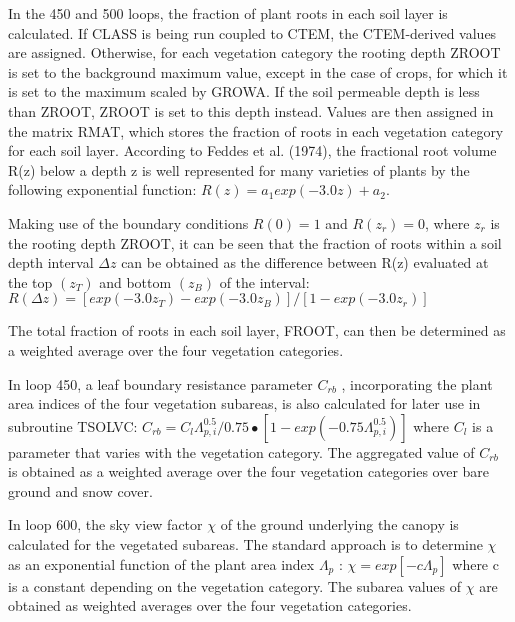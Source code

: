 In the 450 and 500 loops, the fraction of plant roots in each soil layer is calculated. If C\+L\+A\+S\+S is being run coupled to C\+T\+E\+M, the C\+T\+E\+M-\/derived values are assigned. Otherwise, for each vegetation category the rooting depth Z\+R\+O\+O\+T is set to the background maximum value, except in the case of crops, for which it is set to the maximum scaled by G\+R\+O\+W\+A. If the soil permeable depth is less than Z\+R\+O\+O\+T, Z\+R\+O\+O\+T is set to this depth instead. Values are then assigned in the matrix R\+M\+A\+T, which stores the fraction of roots in each vegetation category for each soil layer. According to Feddes et al. (1974), the fractional root volume R(z) below a depth z is well represented for many varieties of plants by the following exponential function\+: $R(z) = a_1 exp(-3.0z) + a_2.$

Making use of the boundary conditions $R(0) = 1$ and $R(z_r ) = 0$, where $z_r$ is the rooting depth Z\+R\+O\+O\+T, it can be seen that the fraction of roots within a soil depth interval $\Delta z$ can be obtained as the difference between R(z) evaluated at the top $(z_T)$ and bottom $(z_B)$ of the interval\+: $R(\Delta z) = [exp(-3.0z_T) - exp(-3.0z_B)]/ [1 - exp(-3.0z_r)]$

The total fraction of roots in each soil layer, F\+R\+O\+O\+T, can then be determined as a weighted average over the four vegetation categories.

In loop 450, a leaf boundary resistance parameter $C_{rb}$ , incorporating the plant area indices of the four vegetation subareas, is also calculated for later use in subroutine T\+S\+O\+L\+V\+C\+: $C_{rb} = C_l \Lambda_{p,i}^{0.5} /0.75 \bullet [1 - exp(-0.75 \Lambda_{p,i}^{0.5} )]$ where $C_l$ is a parameter that varies with the vegetation category. The aggregated value of $C_{rb}$ is obtained as a weighted average over the four vegetation categories over bare ground and snow cover.

In loop 600, the sky view factor $\chi$ of the ground underlying the canopy is calculated for the vegetated subareas. The standard approach is to determine $\chi$ as an exponential function of the plant area index $\Lambda_p$ \+: $\chi = exp[-c \Lambda_p ]$ where c is a constant depending on the vegetation category. The subarea values of $\chi$ are obtained as weighted averages over the four vegetation categories.

